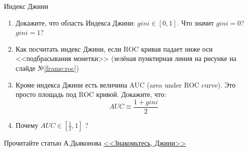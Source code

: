 \begin{frame}{Индекс Джини}
	\begin{enumerate}
		\item Докажите, что область Индекса Джини: $gini \in [0,1]$. 
		Что значит $gini = 0$? $gini = 1$?
		\item Как посчитать индекс Джини, если ROC кривая падает ниже оси <<подбрасывания монетки>> (зелёная пунктирная линия на рисунке на слайде №\ref{frame:roc})
		\item Кроме индекса Джини есть величина AUC (area under ROC curve). 
		Это просто площадь под ROC кривой. Докажите, что:
		\begin{equation}
		AUC \equiv \frac{1+gini}{2} 
		\end{equation}
		\item Почему $AUC \in [\frac{1}{2}, 1]$ ?
	\end{enumerate}
	Прочитайте статью А.Дьяконова
	\href{https://dyakonov.org/2015/12/15/\%D0\%B7\%D0\%BD\%D0\%B0\%D0\%BA\%D0\%BE\%D0\%BC\%D1\%8C\%D1\%82\%D0\%B5\%D1\%81\%D1\%8C-\%D0\%B4\%D0\%B6\%D0\%B8\%D0\%BD\%D0\%B8/}{<<Знакомьтесь, Джини>>}
\end{frame}
  

